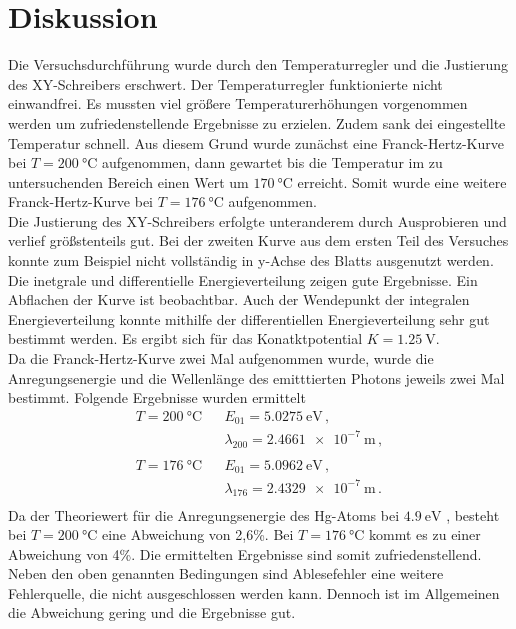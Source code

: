 \section{Diskussion}
\label{sec:Diskussion}

Die Versuchsdurchführung wurde durch den Temperaturregler und die Justierung des XY-Schreibers erschwert.
Der Temperaturregler funktionierte nicht einwandfrei.
Es mussten viel größere Temperaturerhöhungen vorgenommen werden um zufriedenstellende Ergebnisse zu erzielen.
Zudem sank dei eingestellte Temperatur schnell.
Aus diesem Grund wurde zunächst eine Franck-Hertz-Kurve bei $T = \SI{200}{\celsius}$ aufgenommen, dann gewartet bis
die Temperatur im zu untersuchenden Bereich einen Wert um $\SI{170}{\celsius}$ erreicht.
Somit wurde eine weitere Franck-Hertz-Kurve bei $T = \SI{176}{\celsius}$ aufgenommen. \\
\noindent
Die Justierung des XY-Schreibers erfolgte unteranderem durch Ausprobieren und verlief größstenteils gut.
Bei der zweiten Kurve aus dem ersten Teil des Versuches konnte zum Beispiel nicht vollständig in y-Achse des Blatts ausgenutzt werden. \\%


\noindent
Die inetgrale und differentielle Energieverteilung zeigen gute Ergebnisse.
Ein Abflachen der Kurve ist beobachtbar.
Auch der Wendepunkt der integralen Energieverteilung konnte mithilfe der differentiellen Energieverteilung sehr gut bestimmt werden.
Es ergibt sich für das Konatktpotential $K = \SI{1.25}{\volt}$. \\


\noindent
Da die Franck-Hertz-Kurve zwei Mal aufgenommen wurde, wurde die Anregungsenergie und die Wellenlänge des emitttierten Photons jeweils 
zwei Mal bestimmt.
Folgende Ergebnisse wurden ermittelt
\begin{align*}
    T = \SI{200}{\celsius}&                  &E_{01}=\SI{5.0275}{\electronvolt} \, , \\
                          &          &\lambda_{200} = \SI{2.4661e-7}{\metre} \, , \\
                                    \\
    T = \SI{176}{\celsius}&                  &E_{01}=\SI{5.0962}{\electronvolt}  \, , \\
                          &          &\lambda_{176} = \SI{2.4329e-7}{\metre} \, . \\
\end{align*}
\noindent
Da der Theoriewert für die Anregungsenergie des Hg-Atoms bei $\SI{4.9}{\electronvolt}$ \cite{theo}, besteht bei $T = \SI{200}{\celsius}$ eine Abweichung von 2,6\%.
Bei $T = \SI{176}{\celsius}$ kommt es zu einer Abweichung von 4\%.
Die ermittelten Ergebnisse sind somit zufriedenstellend.\\
\noindent
Neben den oben genannten Bedingungen sind Ablesefehler eine weitere Fehlerquelle, die nicht ausgeschlossen werden kann.
Dennoch ist im Allgemeinen die Abweichung gering und die Ergebnisse gut.

